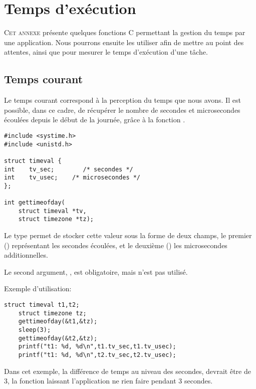 
\chapter{Temps d'exécution}\label{sec:temps}

\startchapter


\lettrine[lines=4]{C}{et annexe} présente quelques fonctions C permettant la gestion du temps par une application. Nous pourrons ensuite les utiliser afin de mettre au point des attentes, ainsi que pour mesurer le temps d'exécution d'une tâche.

\section{Temps courant}

Le temps courant correspond à la perception du temps que nous avons. Il est possible, dans ce cadre, de récupérer le nombre de secondes et microsecondes écoulées depuis le début de la journée, grâce à la fonction .


\begin{lstlisting}
#include <systime.h>
#include <unistd.h>

struct timeval {
int    tv_sec;        /* secondes */
int    tv_usec;    /* microsecondes */
};

int gettimeofday(
	struct timeval *tv,
	struct timezone *tz);
\end{lstlisting}


 Le type  permet de stocker cette valeur sous la forme de deux champs, le premier () représentant les secondes écoulées, et le deuxième () les microsecondes additionnelles.

Le second argument, , est obligatoire, mais n'est pas utilisé.

Exemple d'utilisation:

\begin{lstlisting}[frame=trBL]
	struct timeval t1,t2;
	struct timezone tz;
	gettimeofday(&t1,&tz);
	sleep(3);
	gettimeofday(&t2,&tz);
	printf("t1: %d, %d\n",t1.tv_sec,t1.tv_usec);
	printf("t1: %d, %d\n",t2.tv_sec,t2.tv_usec);
\end{lstlisting}

Dans cet exemple, la différence de temps au niveau des secondes, devrait être de 3, la fonction  laissant l'application ne rien faire pendant 3 secondes.


